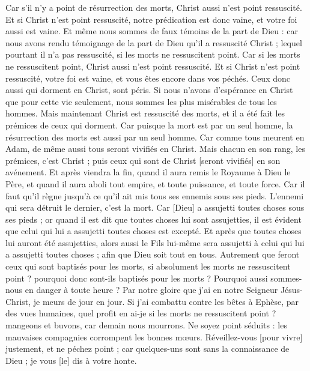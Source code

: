 \begin{multicols}{2}
Car s'il n'y a point de résurrection des morts, Christ aussi n'est point ressuscité.
Et si Christ n'est point ressuscité, notre prédication est donc vaine, et votre foi aussi est vaine.
Et même nous sommes de faux témoins de la part de Dieu : car nous avons rendu témoignage de la part de Dieu qu'il a ressuscité Christ ; lequel pourtant il n'a pas ressuscité, si les morts ne ressuscitent point.
Car si les morts ne ressuscitent point, Christ aussi n'est point ressuscité.
Et si Christ n'est point ressuscité, votre foi est vaine, et vous êtes encore dans vos péchés.
Ceux donc aussi qui dorment en Christ, sont péris.
Si nous n'avons d'espérance en Christ que pour cette vie seulement, nous sommes les plus misérables de tous les hommes.
Mais maintenant Christ est ressuscité des morts, et il a été fait les prémices de ceux qui dorment.
Car puisque la mort est par un seul homme, la résurrection des morts est aussi par un seul homme.
Car comme tous meurent en Adam, de même aussi tous seront vivifiés en Christ.
Mais chacun en son rang, les prémices, c'est Christ ; puis ceux qui sont de Christ [seront vivifiés] en son avénement.
Et après viendra la fin, quand il aura remis le Royaume à Dieu le Père, et quand il aura aboli tout empire, et toute puissance, et toute force.
Car il faut qu'il règne jusqu'à ce qu'il ait mis tous ses ennemis sous ses pieds.
L'ennemi qui sera détruit le dernier, c'est la mort.
Car [Dieu] a assujetti toutes choses sous ses pieds ; or quand il est dit que toutes choses lui sont assujetties, il est évident que celui qui lui a assujetti toutes choses est excepté.
Et après que toutes choses lui auront été assujetties, alors aussi le Fils lui-même sera assujetti à celui qui lui a assujetti toutes choses ; afin que Dieu soit tout en tous.
Autrement que feront ceux qui sont baptisés pour les morts, si absolument les morts ne ressuscitent point ? pourquoi donc sont-ils baptisés pour les morts ?
Pourquoi aussi sommes-nous en danger à toute heure ?
Par notre gloire que j'ai en notre Seigneur Jésus-Christ, je meurs de jour en jour.
Si j'ai combattu contre les bêtes à Ephèse, par des vues humaines, quel profit en ai-je si les morts ne ressuscitent point ? mangeons et buvons, car demain nous mourrons.
Ne soyez point séduits : les mauvaises compagnies corrompent les bonnes mœurs.
Réveillez-vous [pour vivre] justement, et ne péchez point ; car quelques-uns sont sans la connaissance de Dieu ; je vous [le] dis à votre honte.

\end{multicols}
